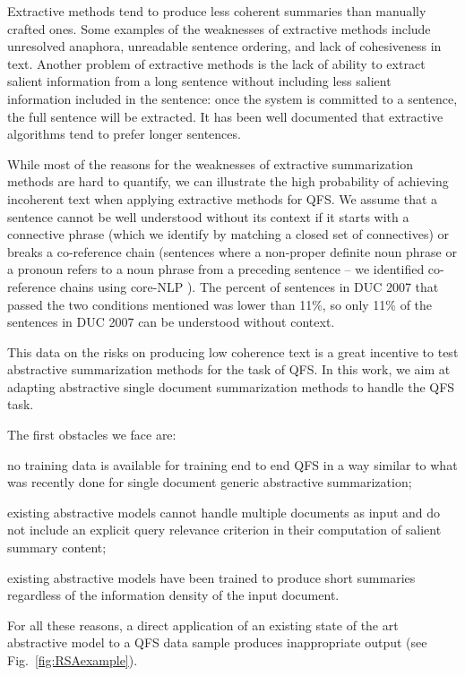 \documentclass[11pt,a4paper]{article}
\begin{document}
Extractive methods tend to produce less coherent summaries than manually crafted ones. Some examples of the weaknesses of extractive methods include unresolved anaphora, unreadable sentence ordering, and lack of cohesiveness in text. Another problem of extractive methods is the lack of ability to extract salient information from a long sentence without including less salient information included in the sentence: once the system is committed to a sentence, the full sentence will be extracted.  It has been well documented that extractive algorithms \cite{haghighi2009exploring, nallapati2017summarunner} tend to prefer longer sentences.

While most of the reasons for the weaknesses of extractive summarization methods are hard to quantify, we can illustrate the high probability of achieving incoherent text when applying extractive methods for QFS. We assume that a sentence cannot be well understood without its context if it starts with a connective phrase (which we identify by matching a closed set of connectives) or breaks a co-reference chain (sentences where a non-proper definite noun phrase or a pronoun refers to a noun phrase from a preceding sentence -- we identified co-reference chains using core-NLP \cite{lee2013deterministic}). The percent of sentences in DUC 2007 that passed the two conditions mentioned was lower than 11\%, so only 11\% of the sentences in DUC 2007 can be understood without context. 

This data on the risks on producing low coherence text is a great incentive to test abstractive summarization methods for the task of QFS. In this work, we aim at adapting abstractive single document summarization methods to handle the QFS task.  

The first obstacles we face are: 
\begin{enumerate*}[label=(\itshape\alph*\upshape)]
\item no training data is available for training end to end QFS in a way similar to what was recently done for single document generic abstractive summarization;
\item existing abstractive models cannot handle multiple documents as input and do not include an explicit query relevance criterion in their computation of salient summary content;
\item existing abstractive models have been trained to produce short summaries regardless of the information density of the input document.
\end{enumerate*}  For all these reasons, a direct application of an existing state of the art abstractive model to a QFS data sample produces inappropriate output (see Fig.~\ref{fig:RSAexample}).
\end{document}
